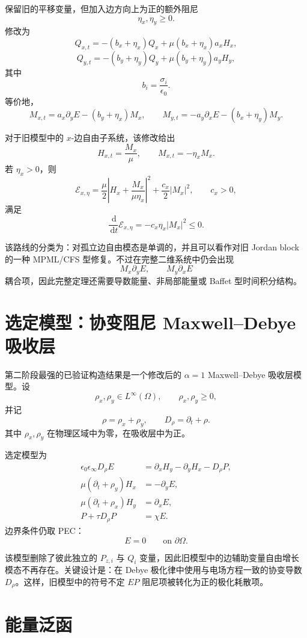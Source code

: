 \documentclass[UTF8,a4paper,12pt]{ctexart}
\newcommand{\dd}{\,\mathrm{d}}
\newcommand{\Ecal}{\mathcal E}
\begin{document}
保留旧的平移变量，但加入边方向上为正的额外阻尼
\[
\eta_x,\eta_y\ge0.
\]
修改为
\[
Q_{x,t}=-(b_x+\eta_x)Q_x+\mu(b_x+\eta_x)a_xH_x,
\]
\[
Q_{y,t}=-(b_y+\eta_y)Q_y+\mu(b_y+\eta_y)a_yH_y,
\]
其中
\[
b_i=\frac{\sigma_i}{\epsilon_0}.
\]
等价地，
\[
M_{x,t}=a_x\partial_yE-(b_y+\eta_x)M_x,\qquad
M_{y,t}=-a_y\partial_xE-(b_x+\eta_y)M_y .
\]

对于旧模型中的 \(x\)-边自由子系统，该修改给出
\[
H_{x,t}=\frac{M_x}{\mu},\qquad M_{x,t}=-\eta_xM_x .
\]
若 \(\eta_x>0\)，则
\[
\Ecal_{x,\eta}
=\frac{\mu}{2}\left|H_x+\frac{M_x}{\mu\eta_x}\right|^2
+\frac{c_x}{2}|M_x|^2,\qquad c_x>0,
\]
满足
\[
\frac{\dd}{\dd t}\Ecal_{x,\eta}
=-c_x\eta_x|M_x|^2\le0 .
\]

该路线的分类为：对孤立边自由模态是单调的，并且可以看作对旧 Jordan block 的一种 MPML/CFS 型修复。不过在完整二维系统中仍会出现
\[
M_x\partial_yE,\qquad M_y\partial_xE
\]
耦合项，因此完整定理还需要导数能量、非局部能量或 Baffet 型时间积分结构。

\section{选定模型：协变阻尼 Maxwell--Debye 吸收层}

第二阶段最强的已验证构造结果是一个修改后的 \(\alpha=1\) Maxwell--Debye 吸收层模型。设
\[
\rho_x,\rho_y\in L^\infty(\Omega),\qquad
\rho_x,\rho_y\ge0,
\]
并记
\[
\rho=\rho_x+\rho_y,\qquad D_\rho=\partial_t+\rho .
\]
其中 \(\rho_x,\rho_y\) 在物理区域中为零，在吸收层中为正。

选定模型为
\begin{equation}
\boxed{
\begin{aligned}
\epsilon_0\epsilon_\infty D_\rho E
&=\partial_xH_y-\partial_yH_x-D_\rho P,\\
\mu(\partial_t+\rho_y)H_x&=-\partial_yE,\\
\mu(\partial_t+\rho_x)H_y&=\partial_xE,\\
P+\tau D_\rho P&=\chi E .
\end{aligned}}
\label{eq:covariant-model}
\end{equation}
边界条件仍取 PEC：
\[
E=0\qquad\text{on }\partial\Omega .
\]

该模型删除了彼此独立的 \(P_{z,i}\) 与 \(Q_i\) 变量，因此旧模型中的边辅助变量自由增长模态不再存在。关键设计是：在 Debye 极化律中使用与电场方程一致的协变导数 \(D_\rho\)。这样，旧模型中的符号不定 \(EP\) 阻尼项被转化为正的极化耗散项。

\section{能量泛函}
\end{document}
